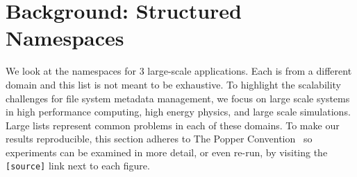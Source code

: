 \section{Background: Structured Namespaces}
\label{sec:motivating-examples}

We look at the namespaces for 3 large-scale applications.  Each is from a
different domain and this list is not meant to be exhaustive.  To highlight the
scalability challenges for file system metadata management, we focus on large
scale systems in high performance computing, high energy physics, and large
scale simulations. Large lists represent common problems in each of these
domains.  To make our results reproducible, this section adheres to The Popper
Convention~\cite{jimenez:ipdpsw17-popper} so experiments can be examined in
more detail, or even re-run, by visiting the \texttt{[source]} link next to
each figure. 

